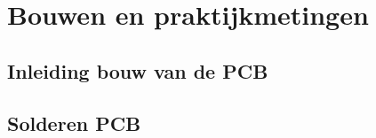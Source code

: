 \section{Bouwen en praktijkmetingen}
\subsection{Inleiding bouw van de PCB}
\subsection{Solderen PCB}